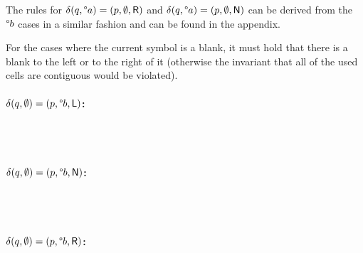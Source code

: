 \documentclass[a4paper,UKenglish,cleveref, autoref]{lipics-v2019}
\begin{document}
The rules for $\delta(q, \degree a) = (p, \emptyset, \textsf{R})$ and $\delta(q, \degree a) = (p, \emptyset, \textsf{N})$ can be derived from the $\degree b$ cases in a similar fashion and can be found in the appendix.

For the cases where the current symbol is a blank, it must hold that there is a blank to the left or to the right of it (otherwise the invariant that all of the used cells are contiguous would be violated).
\paragraph*{$\delta(q, \emptyset) = (p, \degree b, \textsf{L})$:}
\begin{center}
   \\[3ex]
   \\[3ex]
\end{center}

\paragraph*{$\delta(q, \emptyset) = (p, \degree b, \textsf{N})$:}
\begin{center}
   \\[3ex]
   \\[3ex]
\end{center}

\paragraph*{$\delta(q, \emptyset) = (p, \degree b, \textsf{R})$:}
\begin{center}
   \\[3ex]
   \\[3ex]
\end{center}
\end{document}
